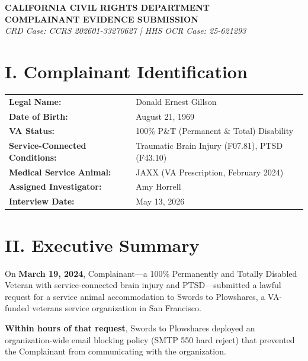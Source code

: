 \documentclass[11pt, a4paper]{article}
\begin{document}
\begin{tcolorbox}[colback=navyblue!5, colframe=navyblue, arc=0mm, boxrule=0.5mm]
    \centering
    \Large \textbf{CALIFORNIA CIVIL RIGHTS DEPARTMENT} \\
    \vspace{0.2cm}
    \large \textbf{COMPLAINANT EVIDENCE SUBMISSION} \\
    \small \textit{CRD Case: CCRS 202601-33270627 | HHS OCR Case: 25-621293}
\end{tcolorbox}

\vspace{0.5cm}

\section{I. Complainant Identification}
\begin{tabular}{ll}
    \textbf{Legal Name:} & Donald Ernest Gillson \\
    \textbf{Date of Birth:} & August 21, 1969 \\
    \textbf{VA Status:} & 100\% P\&T (Permanent \& Total) Disability \\
    \textbf{Service-Connected Conditions:} & Traumatic Brain Injury (F07.81), PTSD (F43.10) \\
    \textbf{Medical Service Animal:} & JAXX (VA Prescription, February 2024) \\
    \textbf{Assigned Investigator:} & Amy Horrell \\
    \textbf{Interview Date:} & May 13, 2026
\end{tabular}

\vspace{0.5cm}

\section{II. Executive Summary}

On \textbf{March 19, 2024}, Complainant---a 100\% Permanently and Totally Disabled Veteran with service-connected brain injury and PTSD---submitted a lawful request for a service animal accommodation to Swords to Plowshares, a VA-funded veterans service organization in San Francisco.

\textbf{Within hours of that request}, Swords to Plowshares deployed an organization-wide email blocking policy (SMTP 550 hard reject) that prevented the Complainant from communicating with the organization.
\end{document}
